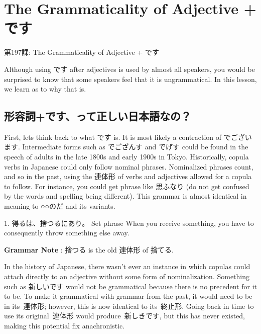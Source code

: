     
\chapter{The Grammaticality of Adjective + です}

\begin{center}
\begin{Large}
第197課: The Grammaticality of Adjective + です 
\end{Large}
\end{center}
 
\par{ Although using です after adjectives is used by almost all speakers, you would be surprised to know that some speakers feel that it is ungrammatical. In this lesson, we learn as to why that is.  }
      
\section{形容詞+です、って正しい日本語なの？}
  First, let\textquotesingle s think back to what です is. It is most likely a contraction of でございます. Intermediate forms such as でござんす and でげす could be found in the speech of adults in the late 1800s and early 1900s in Tokyo. Historically, copula verbs in Japanese could only follow nominal phrases. Nominalized phrases count, and so in the past, using the 連体形 of verbs and adjectives allowed for a copula to follow. For instance, you could get phrase like 思ふなり (do not get confused by the words and spelling being different). This grammar is almost identical in meaning to ○○のだ and its variants.  
\par{1. 得るは、捨つるにあり。 Set phrase \hfill\break
When you receive something, you have to consequently throw something else away. }
 
\par{\textbf{Grammar Note }: 捨つる is the old 連体形 of 捨てる. }
 
\par{ In the history of Japanese, there wasn't ever an instance in which copulas could attach directly to an adjective without some form of nominalization. Something such as 新しいです would not be grammatical because there is no precedent for it to be. To make it grammatical with grammar from the past, it would need to be in its 連体形; however, this is now identical to its 終止形. Going back in time to use its original 連体形 would produce 新しきです, but this has never existed, making this potential fix anachronistic. }
 
